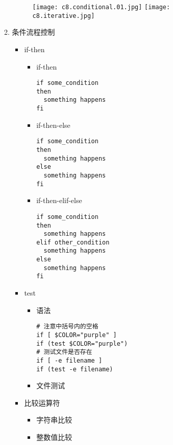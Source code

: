 \documentclass{TIJMUjiaoanLL}
\begin{document}
\begin{enumerate}
\begin{enumerate}
    \vspace*{-10pt}
    \begin{figure}[h]
      \centering
      \texttt{[image: c8.conditional.01.jpg]}
      \quad
      \texttt{[image: c8.iterative.jpg]}
    \end{figure}
    \vspace*{-10pt}


\otherTail
\newpage
\otherHeader


      \item 条件流程控制
	\begin{itemize}
	  \item if-then
	    \begin{itemize}
	      \item if-then
\begin{verbatim}
if some_condition
then
  something happens
fi
\end{verbatim}
	      \item if-then-else
\begin{verbatim}
if some_condition
then
  something happens
else
  something happens
fi
\end{verbatim}
	      \item if-then-elif-else
\begin{verbatim}
if some_condition
then
  something happens
elif other_condition
  something happens
else
  something happens
fi
\end{verbatim}
	    \end{itemize}

	  \item test
	    \begin{itemize}
	      \item 语法
\begin{verbatim}
# 注意中括号内的空格
if [ $COLOR="purple" ]
if (test $COLOR="purple")
# 测试文件是否存在
if [ -e filename ]
if (test -e filename)
\end{verbatim}
	      \item 文件测试
	    \end{itemize}

	  \item 比较运算符
	    \begin{itemize}
	      \item 字符串比较
	      \item 整数值比较
	    \end{itemize}


\end{itemize}
\end{enumerate}
\end{enumerate}
\end{document}
